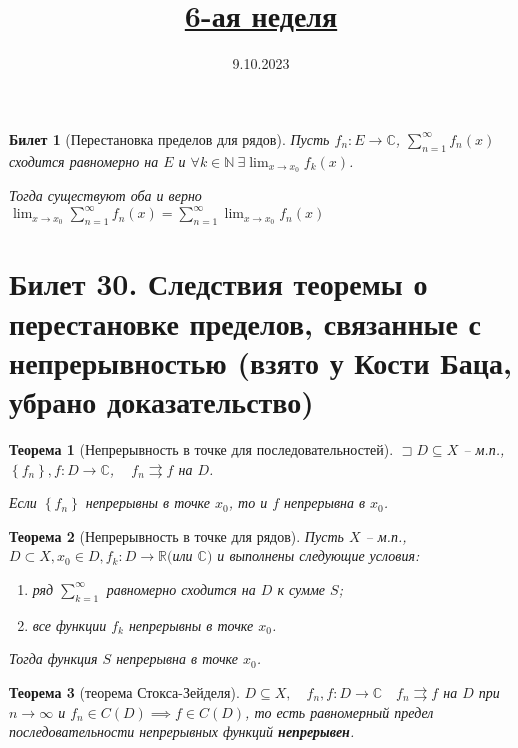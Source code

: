 \documentclass[11pt,a4paper,oneside]{scrartcl}
\title{\href{https://www.youtube.com/live/T8Loz33oa0E?si=ALg7D2j652468pJr}{6-ая неделя}}
\date{9.10.2023}
\newtheorem*{theorem}{Теорема}
\newtheorem{ticket}{Билет}
\begin{document}
\pagestyle{empty}

\maketitle


\setcounter{ticket}{29}
\addtocounter{ticket}{-1}
\begin{ticket}[Перестановка пределов для рядов]
    Пусть $f_n : E \rightarrow \mathbb{C}$, $\sum_{n=1}^\infty f_n(x)$ сходится
    равномерно на $E$ и $\forall k \in \mathbb{N} \ \exists \lim_{x \rightarrow x_0} f_k(x)$.

    Тогда существуют оба и верно
    $\lim_{x \rightarrow x_0} \sum_{n=1}^\infty f_n(x)
    = \sum_{n=1}^\infty \lim_{x \rightarrow x_0} f_n(x)$
\end{ticket}

\section*{Билет 30. Следствия теоремы о перестановке пределов, связанные с непрерывностью
    (взято у Кости Баца, убрано доказательство)}

\begin{theorem}[Непрерывность в точке для последовательностей]
    $\sqsupset D\subseteq X$ -- м.п.,~ $\left\{ f_n \right\} , f:D \to \mathbb{C}$, ~
    $f_n\rightrightarrows f$ на  $D$.

    Если $\left\{ f_n \right\} $ непрерывны в точке $x_0$, то и $f$ непрерывна в $x_0$.
\end{theorem}

\begin{theorem}[Непрерывность в точке для рядов]
    Пусть $X$ -- м.п., $D \subset X, x_0 \in D, f_k: D \to \mathbb{R}
    ($или $\mathbb{C})$ и выполнены следующие условия:
    \begin{enumerate}
        \item ряд $\sum\limits_{k=1}^\infty$ равномерно сходится на $D$ к сумме $S$;
        \item все функции $f_k$ непрерывны в точке $x_0$.
    \end{enumerate}
    Тогда функция $S$ непрерывна в точке $x_0$.
\end{theorem}

\begin{theorem}[теорема Стокса-Зейделя]
    $D\subseteq X,\quad f_n, f: D \to \mathbb{C}\quad f_n\rightrightarrows f$ на $D$ при
    $n\to \infty $ и $f_n\in C(D) \implies f\in C(D)$, то есть
    равномерный предел последовательности непрерывных функций \textbf{непрерывен}.
\end{theorem}
\end{document}
